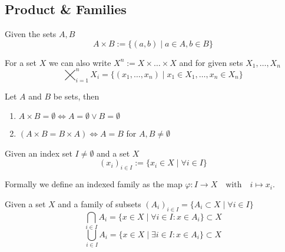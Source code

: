 \subsection{Product \& Families}
\begin{definition}
   Given the sets \(A, B\)
   \[A \times B := \{(a, b) \mid a \in A, b \in B\}\]
\end{definition}
\begin{remark}[Notation]
   For a set \(X\) we can also write \(X^n := X \times \ldots \times X\) and for given sets \(X_1, \ldots, X_n\)
   \[\bigtimes_{i=1}^n X_i = \big\{(x_1, \ldots, x_n) \mid x_1 \in X_1, \ldots, x_n \in X_n\big\}\]
\end{remark}

\begin{proposition}
   Let \(A\) and \(B\) be sets, then
   \begin{enumerate}[label=\roman*, align=Center]
      \item \(A \times B = \emptyset \iff A = \emptyset \lor B = \emptyset\)
      \item \((A \times B = B \times A) \iff A = B\) for \(A, B \neq \emptyset\)
   \end{enumerate}
\end{proposition}

\begin{definition}
   Given an index set \(I \neq \emptyset\) and a set \(X\)
   \[(x_i)_{i \in I} := \{x_i \in X \mid \forall i \in I\}\]
\end{definition}
\begin{remark}
   Formally we define an indexed family as the map \(\varphi: I \to X \quad\text{with}\quad i \mapsto x_i\).
\end{remark}
\begin{remark}
   Given a set \(X\) and a family of subsets \((A_i)_{i \in I} = \{A_i \subset X \mid \forall i \in I\}\)
   \[\bigcap_{i \in I} A_i = \{x \in X \mid \forall i \in I: x \in A_i\} \subset X\]
   \[\bigcup_{i \in I} A_i = \{x \in X \mid \exists i \in I: x \in A_i\} \subset X\]
\end{remark}

